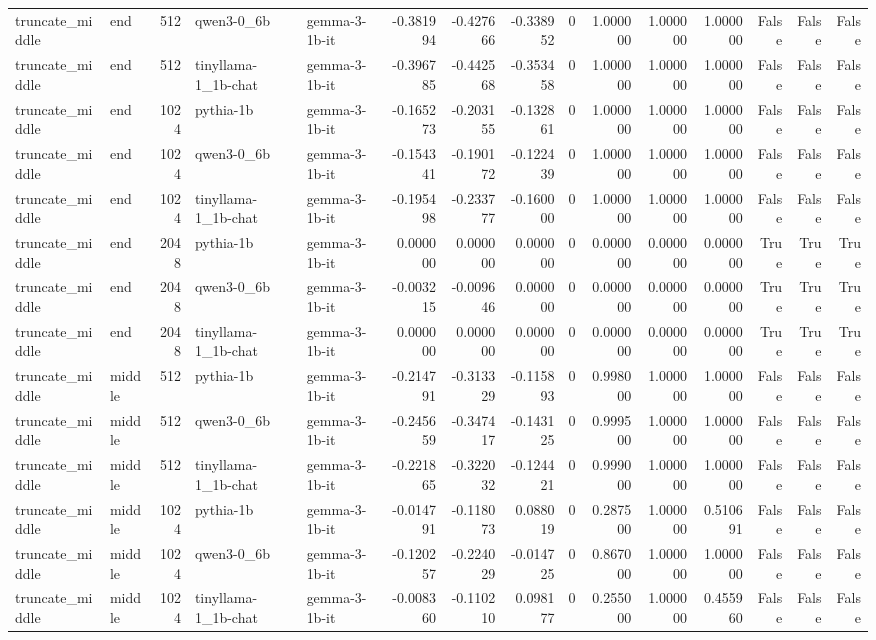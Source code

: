 \begin{tabular}{llrllrrrrrrrrrr}
truncate_middle & end & 512 & qwen3-0_6b & gemma-3-1b-it & -0.381994 & -0.427666 & -0.338952 & 0 & 1.000000 & 1.000000 & 1.000000 & False & False & False \\
truncate_middle & end & 512 & tinyllama-1_1b-chat & gemma-3-1b-it & -0.396785 & -0.442568 & -0.353458 & 0 & 1.000000 & 1.000000 & 1.000000 & False & False & False \\
truncate_middle & end & 1024 & pythia-1b & gemma-3-1b-it & -0.165273 & -0.203155 & -0.132861 & 0 & 1.000000 & 1.000000 & 1.000000 & False & False & False \\
truncate_middle & end & 1024 & qwen3-0_6b & gemma-3-1b-it & -0.154341 & -0.190172 & -0.122439 & 0 & 1.000000 & 1.000000 & 1.000000 & False & False & False \\
truncate_middle & end & 1024 & tinyllama-1_1b-chat & gemma-3-1b-it & -0.195498 & -0.233777 & -0.160000 & 0 & 1.000000 & 1.000000 & 1.000000 & False & False & False \\
truncate_middle & end & 2048 & pythia-1b & gemma-3-1b-it & 0.000000 & 0.000000 & 0.000000 & 0 & 0.000000 & 0.000000 & 0.000000 & True & True & True \\
truncate_middle & end & 2048 & qwen3-0_6b & gemma-3-1b-it & -0.003215 & -0.009646 & 0.000000 & 0 & 0.000000 & 0.000000 & 0.000000 & True & True & True \\
truncate_middle & end & 2048 & tinyllama-1_1b-chat & gemma-3-1b-it & 0.000000 & 0.000000 & 0.000000 & 0 & 0.000000 & 0.000000 & 0.000000 & True & True & True \\
truncate_middle & middle & 512 & pythia-1b & gemma-3-1b-it & -0.214791 & -0.313329 & -0.115893 & 0 & 0.998000 & 1.000000 & 1.000000 & False & False & False \\
truncate_middle & middle & 512 & qwen3-0_6b & gemma-3-1b-it & -0.245659 & -0.347417 & -0.143125 & 0 & 0.999500 & 1.000000 & 1.000000 & False & False & False \\
truncate_middle & middle & 512 & tinyllama-1_1b-chat & gemma-3-1b-it & -0.221865 & -0.322032 & -0.124421 & 0 & 0.999000 & 1.000000 & 1.000000 & False & False & False \\
truncate_middle & middle & 1024 & pythia-1b & gemma-3-1b-it & -0.014791 & -0.118073 & 0.088019 & 0 & 0.287500 & 1.000000 & 0.510691 & False & False & False \\
truncate_middle & middle & 1024 & qwen3-0_6b & gemma-3-1b-it & -0.120257 & -0.224029 & -0.014725 & 0 & 0.867000 & 1.000000 & 1.000000 & False & False & False \\
truncate_middle & middle & 1024 & tinyllama-1_1b-chat & gemma-3-1b-it & -0.008360 & -0.110210 & 0.098177 & 0 & 0.255000 & 1.000000 & 0.455960 & False & False & False \\

\end{tabular}
